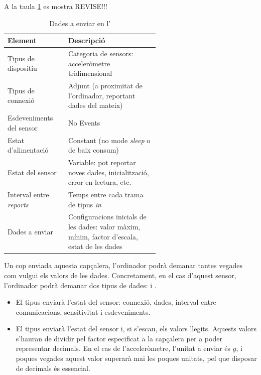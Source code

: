 A la taula \ref{tab:hid-rd} es mostra REVISE!!!

\begin{table}[h!]
    \centering
    \begin{tabular}{l p{0.6\linewidth}}
        \toprule
        \textbf{Element} & \textbf{Descripció} \\ \midrule
        Tipus de dispositiu & Categoria de sensors: acceleròmetre tridimensional \\
        Tipus de connexió & Adjunt (a proximitat de l'ordinador, reportant dades del mateix) \\
        Esdeveniments del sensor & No Events \\
        Estat d'alimentació & Constant (no mode \textit{sleep} o de baix consum) \\
        Estat del sensor & Variable: pot reportar noves dades, inicialització, error en lectura, etc. \\
        Interval entre \textit{reports} & Temps entre cada trama de tipus \textit{in} \\
        Dades a enviar & Configuracions inicials de les dades: valor màxim, mínim, factor d'escala, estat de les dades \\
        \bottomrule
    \end{tabular}
    \caption{Dades a enviar en l'}
    \label{tab:hid-rd}
\end{table}

Un cop enviada aquesta capçalera,
l'ordinador podrà demanar tantes vegades com vulgui els valors de les dades.
Concretament, en el cas d'aquest sensor, l'ordinador podrà demanar dos tipus
de dades:  i .

\begin{itemize}
    \item El tipus  enviarà l'estat del sensor: connexió, dades,
    interval entre comunicacions, sensitivitat i esdeveniments.
    \item El tipus  enviarà l'estat del sensor i, si s'escau, els
    valors llegits. Aquests valors s'hauran de dividir pel factor especificat
    a la capçalera per a poder representar decimals. En el cas de l'acceleròmetre,
    l'unitat a enviar és $g$, i poques vegades aquest valor superarà mai
    les poques unitats, pel que disposar de decimals és essencial.
\end{itemize}

